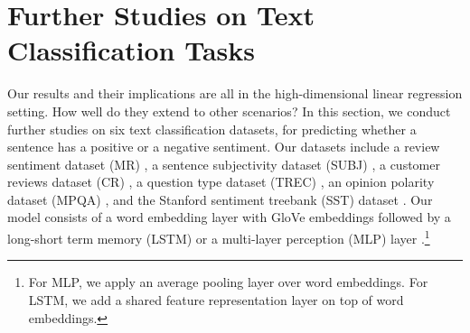 \section{Further Studies on Text Classification Tasks}\label{sec_text}

Our results and their implications are all in the high-dimensional linear regression setting.
How well do they extend to other scenarios?
In this section, we conduct further studies on six text classification datasets, for predicting whether a sentence has a positive or a negative sentiment.
Our datasets include a review sentiment dataset (MR) \cite{pang2005seeing}, a sentence subjectivity dataset (SUBJ) \cite{pang2004sentimental}, a customer reviews dataset (CR) \cite{hu2004mining}, a question type dataset (TREC) \cite{li2002learning}, an opinion polarity dataset (MPQA) \cite{wiebe2005annotating}, and the Stanford sentiment treebank (SST) dataset \cite{socher2013recursive}.
Our model consists of a word embedding layer with GloVe embeddings \cite{pennington2014glove} followed by a long-short term memory (LSTM) or a multi-layer perception (MLP) layer \cite{lei2018simple}.\footnote{For MLP, we apply an average pooling layer over word embeddings. For LSTM, we add a shared feature representation layer on top of word embeddings.}


